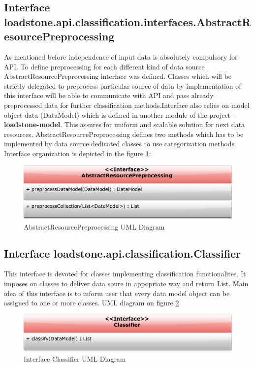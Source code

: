 \subsection{Interface \newline loadstone.api.classification.interfaces.AbstractResourcePreprocessing}
As mentioned before independence of input data is absolutely compulsory for API. To define preprocessing for each different kind of data source  AbstractResourcePreprocessing interface was defined. Classes which will be strictly delegated to preprocess particular source of data by implementation of this interface will be able to communicate with API and pass already preprocessed data for further classification methods.Interface also relies on model object data (DataModel) which is defined in another module of the project - \textbf{loadstone-model}. This assures for uniform and scalable solution for next data resources. AbstractResourcePreprocessing defines two methods which has to be implemented by data source dedicated classes to use categorization methods. Interface organization is depicted in the figure \ref{fig:@=AbstractResourcePreprocessing}:
\begin{figure}[h]
	\centering
	\includegraphics[scale=0.5]{AbstractResourcePreprocessing.png}
	\caption{AbstractResourcePreprocessing UML Diagram}
	\label{fig:@=AbstractResourcePreprocessing}
\end{figure}
\subsection{Interface \newline loadstone.api.classification.Classifier}
This interface is devoted for classes implementing classification functionalites. It imposes on classes to deliver data soure in appopriate way and return List. Main idea of this interface is to inform user that every data model object can be assigned to one or more classes. UML diagram on figure \ref{fig:@=classifier}
\begin{figure}[h]
	\centering
	\includegraphics[scale=0.5]{classifier_interface.png}
	\caption{Interface Classifier UML Diagram}
	\label{fig:@=classifier}
\end{figure}
